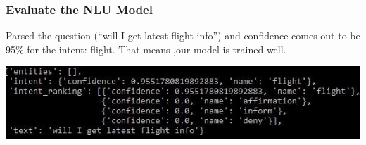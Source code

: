  \begin{frame}[fragile]\frametitle{Evaluate the NLU Model}
Parsed the question (“will I get latest flight info”) and confidence comes out to be 95\% for the intent: flight. That means ,our model is trained well.

\begin{center}
\includegraphics[width=\linewidth,keepaspectratio]{images/mmt4}
\end{center}

\end{frame}


